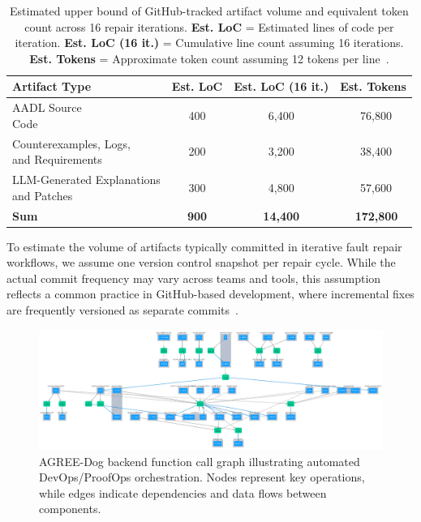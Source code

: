 \label{appendix:test-scenarios}
\pagebreak
\begin{table}[t]
\centering
\begin{tabular}{|l|c|c|c|}
\hline
\textbf{Artifact Type} & \textbf{Est. LoC} & \textbf{Est. LoC (16 it.)} & \textbf{Est. Tokens} \\
\hline
\makecell[l]{AADL Source\\Code} & 400 & 6,400 & ~76,800 \\
\makecell[l]{Counterexamples, Logs,\\and Requirements} & 200 & 3,200 & ~38,400 \\
\makecell[l]{LLM-Generated Explanations\\and Patches} & 300 & 4,800 & ~57,600 \\
\hline
\textbf{Sum} & \textbf{900} & \textbf{14,400} & \textbf{~172,800} \\
\hline
\end{tabular}
\caption{Estimated upper bound of GitHub-tracked artifact volume and equivalent token count across 16 repair iterations. \textbf{Est. LoC} = Estimated lines of code per iteration. \textbf{Est. LoC (16 it.)} = Cumulative line count assuming 16 iterations. \textbf{Est. Tokens} = Approximate token count assuming 12 tokens per line~\cite{openai-tokenizer}.}
\label{tab:github-estimate}
\end{table}

To estimate the volume of artifacts typically committed in iterative fault repair workflows, we assume one version control snapshot per repair cycle. While the actual commit frequency may vary across teams and tools, this assumption reflects a common practice in GitHub-based development, where incremental fixes are frequently versioned as separate commits~\cite{github-commits}.

\pagebreak

\begin{figure}[t]
  \centering
  \includegraphics[height=0.6\textwidth, width=1.0\textwidth]{backend-callgraph.png}
  \caption{AGREE-Dog backend function call graph illustrating automated DevOps/ProofOps orchestration. Nodes represent key operations, while edges indicate dependencies and data flows between components.}
  \label{fig:callgraph}
\end{figure}

\pagebreak



